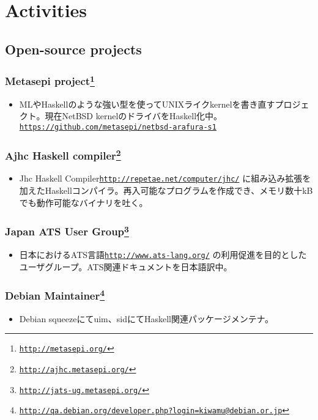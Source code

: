 \documentclass[letterpaper]{article}
\begin{document}
\section*{Activities}

\subsection*{Open-source projects}

\subsubsection*{Metasepi project\footnote{\href{http://metasepi.org/}{\tt http://metasepi.org/}}}
\begin{itemize}
\item MLやHaskellのような強い型を使ってUNIXライクkernelを書き直すプロジェクト。現在NetBSD kernelのドライバをHaskell化中。 \href{https://github.com/metasepi/netbsd-arafura-s1}{\tt https://github.com/metasepi/netbsd-arafura-s1}
\end{itemize}

\subsubsection*{Ajhc Haskell compiler\footnote{\href{http://ajhc.metasepi.org/}{\tt http://ajhc.metasepi.org/}}}
\begin{itemize}
\item Jhc Haskell Compiler\href{http://repetae.net/computer/jhc/}{\tt http://repetae.net/computer/jhc/} に組み込み拡張を加えたHaskellコンパイラ。再入可能なプログラムを作成でき、メモリ数十kBでも動作可能なバイナリを吐く。
\end{itemize}

\subsubsection*{Japan ATS User Group\footnote{\href{http://jats-ug.metasepi.org/}{\tt http://jats-ug.metasepi.org/}}}
\begin{itemize}
\item 日本におけるATS言語\href{http://www.ats-lang.org/}{\tt http://www.ats-lang.org/} の利用促進を目的としたユーザグループ。ATS関連ドキュメントを日本語訳中。
\end{itemize}

\subsubsection*{Debian Maintainer\footnote{\href{http://qa.debian.org/developer.php?login=kiwamu@debian.or.jp}{\tt http://qa.debian.org/developer.php?login=kiwamu@debian.or.jp}}}
\begin{itemize}
\item Debian squeezeにてuim、sidにてHaskell関連パッケージメンテナ。
\end{itemize}
\end{document}

